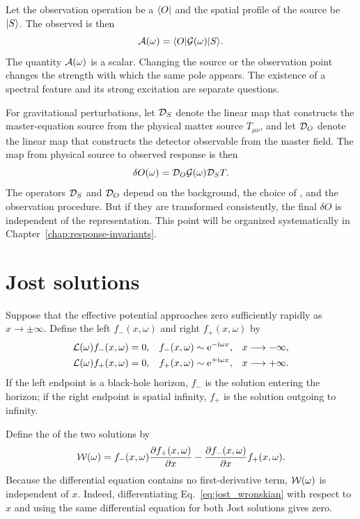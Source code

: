 Let the observation operation be a  $\langle O \rvert$ and the spatial profile of the source be $\lvert S \rangle$. The observed  is then
\begin{equation}
\mathcal{A}(\omega)
=
\langle O \rvert\mathcal{G}(\omega)\lvert S \rangle.
\label{eq:source_observer_amplitude}
\end{equation}
The quantity $\mathcal{A}(\omega)$ is a scalar. Changing the source or the observation point changes the strength with which the same pole appears. The existence of a spectral feature and its strong excitation are separate questions.

For gravitational perturbations, let $\mathcal{D}_S$ denote the linear map that constructs the master-equation source from the physical matter source $T_{\mu\nu}$, and let $\mathcal{D}_O$ denote the linear map that constructs the detector observable from the master field. The map from physical source to observed response is then
\begin{equation}
\delta O(\omega)
=
\mathcal{D}_O\mathcal{G}(\omega)\mathcal{D}_S T.
\label{eq:physical-response-map}
\end{equation}
The operators $\mathcal{D}_S$ and $\mathcal{D}_O$ depend on the background, the choice of , and the observation procedure. But if they are transformed consistently, the final $\delta O$ is independent of the representation. This point will be organized systematically in Chapter~\ref{chap:response-invariants}.

\section{Jost solutions}

Suppose that the effective potential approaches zero sufficiently rapidly as $x\to\pm\infty$. Define the left  $f_-(x,\omega)$ and right  $f_+(x,\omega)$ by
\begin{align}
\mathcal{L}(\omega)f_-(x,\omega)&=0,
&
f_-(x,\omega)&\sim\mathrm{e}^{-\mathrm{i}\omega x},
&&x\longrightarrow-\infty,
\label{eq:left_jost}
\\
\mathcal{L}(\omega)f_+(x,\omega)&=0,
&
f_+(x,\omega)&\sim\mathrm{e}^{+\mathrm{i}\omega x},
&&x\longrightarrow+\infty.
\label{eq:right_jost}
\end{align}
If the left endpoint is a black-hole horizon, $f_-$ is the solution entering the horizon; if the right endpoint is spatial infinity, $f_+$ is the solution outgoing to infinity.

Define the  of the two solutions by
\begin{equation}
\mathcal{W}(\omega)
=
f_-(x,\omega)
\frac{\partial f_+(x,\omega)}{\partial x}
-
\frac{\partial f_-(x,\omega)}{\partial x}
f_+(x,\omega).
\label{eq:jost_wronskian}
\end{equation}
Because the differential equation contains no first-derivative term, $\mathcal{W}(\omega)$ is independent of $x$. Indeed, differentiating Eq.~\eqref{eq:jost_wronskian} with respect to $x$ and using the same differential equation for both Jost solutions gives zero.

